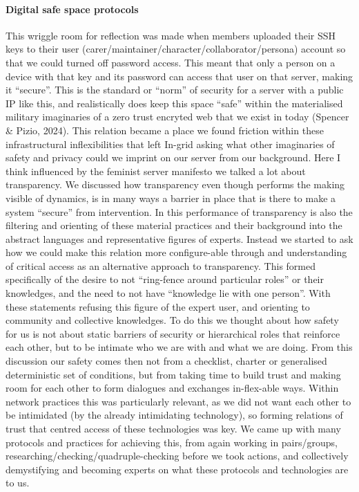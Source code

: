 \hypertarget{digital-safe-space-protocols}{%
\paragraph{Digital safe space
protocols}\label{digital-safe-space-protocols}}

This wriggle room for reflection was made when members uploaded their
SSH keys to their user (carer/maintainer/character/collaborator/persona)
account so that we could turned off password access. This meant that
only a person on a device with that key and its password can access that
user on that server, making it ``secure''. This is the standard or
``norm'' of security for a server with a public IP like this, and
realistically does keep this space ``safe'' within the materialised
military imaginaries of a zero trust encryted web that we exist in today
(Spencer \& Pizio, 2024). This relation became a place we found friction
within these infrastructural inflexibilities that left In-grid asking
what other imaginaries of safety and privacy could we imprint on our
server from our background. Here I think influenced by the feminist
server manifesto we talked a lot about transparency. We discussed how
transparency even though performs the making visible of dynamics, is in
many ways a barrier in place that is there to make a system ``secure''
from intervention. In this performance of transparency is also the
filtering and orienting of these material practices and their background
into the abstract languages and representative figures of experts.
Instead we started to ask how we could make this relation more
configure-able through and understanding of critical access as an
alternative approach to transparency. This formed specifically of the
desire to not ``ring-fence around particular roles'' or their
knowledges, and the need to not have ``knowledge lie with one person''.
With these statements refusing this figure of the expert user, and
orienting to community and collective knowledges. To do this we thought
about how safety for us is not about static barriers of security or
hierarchical roles that reinforce each other, but to be intimate who we
are with and what we are doing. From this discussion our safety comes
then not from a checklist, charter or generalised deterministic set of
conditions, but from taking time to build trust and making room for each
other to form dialogues and exchanges in-flex-able ways. Within network
practices this was particularly relevant, as we did not want each other
to be intimidated (by the already intimidating technology), so forming
relations of trust that centred access of these technologies was key. We
came up with many protocols and practices for achieving this, from again
working in pairs/groups, researching/checking/quadruple-checking before
we took actions, and collectively demystifying and becoming experts on
what these protocols and technologies are to us.

